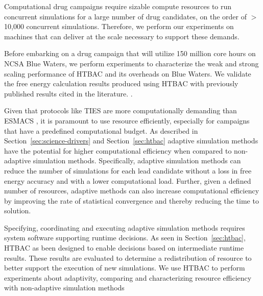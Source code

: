 Computational drug campaigns require sizable compute resources %
to run concurrent simulations for a large number of drug candidates, on the 
order of $>$ 10,000 concurrent simulations. Therefore, we perform our 
experiments on machines that can deliver at the
scale necessary to support these demands. 

Before embarking on a drug campaign that will utilize 150 million core hours
on NCSA Blue Waters, we perform experiments to characterize the weak and
strong scaling performance of HTBAC and its overheads on Blue Waters. We
validate the free energy calculation results produced using HTBAC with 
previously published results cited in the literature. 
.

Given that protocols like TIES are more computationally demanding than ESMACS
, it is paramount to use 
resource efficiently, especially for campaigns that have a predefined 
computational budget. As described in Section~\ref{sec:science-drivers} and 
Section~\ref{sec:htbac} adaptive simulation methods 
have the potential for higher computational efficiency when compared to 
non-adaptive simulation methods. Specifically, adaptive simulation
methods can reduce the number of simulations for each lead candidate without
a loss in free energy accuracy and with a lower computational load. Further,
given a defined number of resources, adaptive methods can also increase
computational efficiency by improving the rate of statistical convergence and 
thereby reducing the time to solution.

Specifying, coordinating and executing adaptive simulation 
methods requires system software supporting runtime decisions. As seen in
Section~\ref{sec:htbac}, HTBAC as been designed to enable decisions based on
intermediate runtime results. These results are evaluated to determine a
redistribution of resource to better support the execution of new
simulations. We use HTBAC to perform experiments about adaptivity, comparing
and characterizing resource efficiency with non-adaptive simulation methods
 

